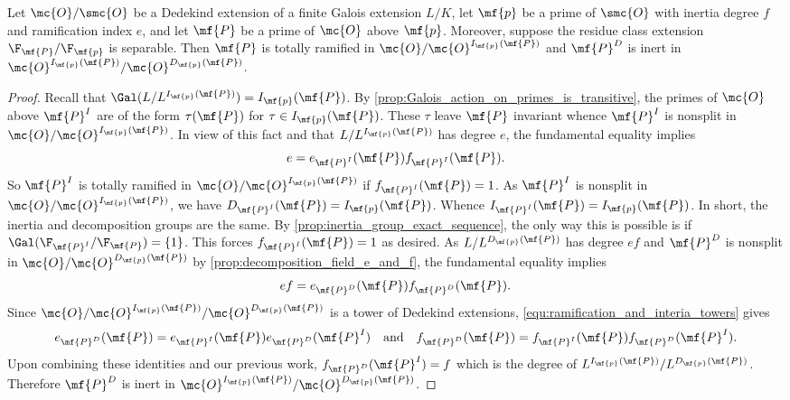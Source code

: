\documentclass[12pt]{article}
\begin{document}
      \begin{proposition}\label{prop:inertia_field_e_and_f}
        Let \(\mc{O}/\smc{O}\) be a Dedekind extension of a finite Galois extension \(L/K\), let \(\mf{p}\) be a prime of \(\smc{O}\) with inertia degree \(f\) and ramification index \(e\), and let \(\mf{P}\) be a prime of \(\mc{O}\) above \(\mf{p}\). Moreover, suppose the residue class extension \(\F_{\mf{P}}/\F_{\mf{p}}\) is separable. Then \(\mf{P}\) is totally ramified in \(\mc{O}/\mc{O}^{I_{\mf{p}}(\mf{P})}\) and \(\mf{P}^{D}\) is inert in \(\mc{O}^{I_{\mf{p}}(\mf{P})}/\mc{O}^{D_{\mf{p}}(\mf{P})}\).
      \end{proposition}
      \begin{proof}
        Recall that \(\Gal(L/L^{I_{\mf{p}}(\mf{P})}) = I_{\mf{p}}(\mf{P})\). By \cref{prop:Galois_action_on_primes_is_transitive}, the primes of \(\mc{O}\) above \(\mf{P}^{I}\) are of the form \(\tau(\mf{P})\) for \(\tau \in I_{\mf{p}}(\mf{P})\). These \(\tau\) leave \(\mf{P}\) invariant whence \(\mf{P}^{I}\) is nonsplit in \(\mc{O}/\mc{O}^{I_{\mf{p}}(\mf{P})}\). In view of this fact and that \(L/L^{I_{\mf{p}}(\mf{P})}\) has degree \(e\), the fundamental equality implies
        \[
          e = e_{\mf{P}^{I}}(\mf{P})f_{\mf{P}^{I}}(\mf{P}).
        \]
        So \(\mf{P}^{I}\) is totally ramified in \(\mc{O}/\mc{O}^{I_{\mf{p}}(\mf{P})}\) if \(f_{\mf{P}^{I}}(\mf{P}) = 1\). As \(\mf{P}^{I}\) is nonsplit in \(\mc{O}/\mc{O}^{I_{\mf{p}}(\mf{P})}\), we have \(D_{\mf{P}^{I}}(\mf{P}) = I_{\mf{p}}(\mf{P})\). Whence \(I_{\mf{P}^{I}}(\mf{P}) = I_{\mf{p}}(\mf{P})\). In short, the inertia and decomposition groups are the same. By \cref{prop:inertia_group_exact_sequence}, the only way this is possible is if \(\Gal(\F_{\mf{P}^{I}}/\F_{\mf{P}}) = \{1\}\). This forces \(f_{\mf{P}^{I}}(\mf{P}) = 1\) as desired. As \(L/L^{D_{\mf{p}}(\mf{P})}\) has degree \(ef\) and \(\mf{P}^{D}\) is nonsplit in \(\mc{O}/\mc{O}^{D_{\mf{p}}(\mf{P})}\) by \cref{prop:decomposition_field_e_and_f}, the fundamental equality implies
        \[
          ef = e_{\mf{P}^{D}}(\mf{P})f_{\mf{P}^{D}}(\mf{P}).
        \]
        Since \(\mc{O}/\mc{O}^{I_{\mf{p}}(\mf{P})}/\mc{O}^{D_{\mf{p}}(\mf{P})}\) is a tower of Dedekind extensions, \cref{equ:ramification_and_interia_towers} gives
        \[
          e_{\mf{P}^{D}}(\mf{P}) = e_{\mf{P}^{I}}(\mf{P})e_{\mf{P}^{D}}(\mf{P}^{I}) \quad \text{and} \quad f_{\mf{P}^{D}}(\mf{P}) = f_{\mf{P}^{I}}(\mf{P})f_{\mf{P}^{D}}(\mf{P}^{I}).
        \]
        Upon combining these identities and our previous work, \(f_{\mf{P}^{D}}(\mf{P}^{I}) = f\) which is the degree of \(L^{I_{\mf{p}}(\mf{P})}/L^{D_{\mf{p}}(\mf{P})}\). Therefore \(\mf{P}^{D}\) is inert in \(\mc{O}^{I_{\mf{p}}(\mf{P})}/\mc{O}^{D_{\mf{p}}(\mf{P})}\).
      \end{proof}
\end{document}
